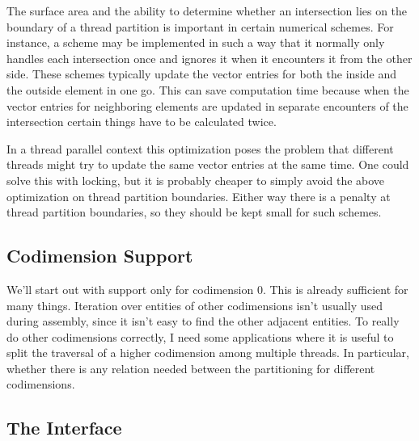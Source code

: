 \documentclass{article}
\begin{document}
The surface area and the ability to determine whether an intersection lies on
the boundary of a thread partition is important in certain numerical schemes.
For instance, a scheme may be implemented in such a way that it normally only
handles each intersection once and ignores it when it encounters it from the
other side.  These schemes typically update the vector entries for both the
inside and the outside element in one go.  This can save computation time
because when the vector entries for neighboring elements are updated in
separate encounters of the intersection certain things have to be calculated
twice.

In a thread parallel context this optimization poses the problem that
different threads might try to update the same vector entries at the same
time.  One could solve this with locking, but it is probably cheaper to simply
avoid the above optimization on thread partition boundaries.  Either way there
is a penalty at thread partition boundaries, so they should be kept small for
such schemes.

\subsection{Codimension Support}

We'll start out with support only for codimension $0$.  This is already
sufficient for many things.  Iteration over entities of other codimensions
isn't usually used during assembly, since it isn't easy to find the other
adjacent entities.  To really do other codimensions correctly, I need some
applications where it is useful to split the traversal of a higher codimension
among multiple threads.  In particular, whether there is any relation needed
between the partitioning for different codimensions.

\subsection{The Interface}
\end{document}
